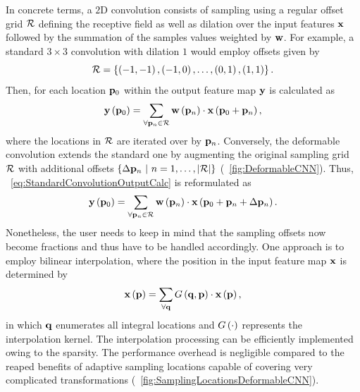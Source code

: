 In concrete terms, a $2$D convolution consists of sampling using a regular offset grid $\mathcal{R}$ defining the receptive field as well as dilation over the input features $\mathbf{x}$ followed by the summation of the samples values weighted by $\mathbf{w}$. For example, a standard $3 \times 3$ convolution with dilation $1$ would employ offsets given by
\begin{equation}
    \label{eq:StandardConvolutionOffsetGrid}
    \mathcal{R} = \left\{ {
        \left( {-1, -1} \right), \left( {-1, 0} \right), \dots, \left( {0, 1} \right), \left( {1, 1} \right)
    } \right\}.
\end{equation}
Then, for each location $\mathbf{p}_0$ within the output feature map $\mathbf{y}$ is calculated as
\begin{equation}
    \label{eq:StandardConvolutionOutputCalc}
    {\mathbf{y}} \left( \mathbf{p}_0 \right) =
    \sum_{\forall \mathbf{p}_n \in \mathcal{R}}
    {\mathbf{w}} \left( \mathbf{p}_n \right) \cdot {\mathbf{x}} \left( \mathbf{p}_0 + \mathbf{p}_n \right),
\end{equation}
where the locations in $\mathcal{R}$ are iterated over by $\mathbf{p}_n$. Conversely, the deformable convolution extends the standard one by augmenting the original sampling grid $\mathcal{R}$ with additional offsets $\left\{ {\Delta \mathbf{p}_n \ |\ n = 1, \dots, \left\vert \mathcal{R} \right\vert} \right\}$ (\figtext{}~\ref{fig:DeformableCNN}). Thus, \eqtext{}~\ref{eq:StandardConvolutionOutputCalc} is reformulated as
\begin{equation}
    \label{eq:DeformableConvolutionOutputCalc}
    {\mathbf{y}} \left( \mathbf{p}_0 \right) =
    \sum_{\forall \mathbf{p}_n \in \mathcal{R}}
    {\mathbf{w}} \left( \mathbf{p}_n \right) \cdot {\mathbf{x}} \left( \mathbf{p}_0 + \mathbf{p}_n + \Delta \mathbf{p}_n \right).
\end{equation}
Nonetheless, the user needs to keep in mind that the sampling offsets now become fractions and thus have to be handled accordingly. One approach is to employ bilinear interpolation, where the position in the input feature map $\mathbf{x}$ is determined by
\begin{equation}
    \label{eq:DeformableConvolutionBilinear}
    {\mathbf{x}} \left( \mathbf{p} \right) =
    \sum_{\forall \mathbf{q}} {G} \left( \mathbf{q}, \mathbf{p} \right) \cdot {\mathbf{x}} \left( \mathbf{p} \right),
\end{equation}
in which $\mathbf{q}$ enumerates all integral locations and ${G} \left( \cdot \right)$ represents the  interpolation kernel. The interpolation processing can be efficiently implemented owing to the sparsity. The performance overhead is negligible compared to the reaped benefits of adaptive sampling locations capable of covering very complicated transformations (\figtext{}~\ref{fig:SamplingLocationsDeformableCNN}).


